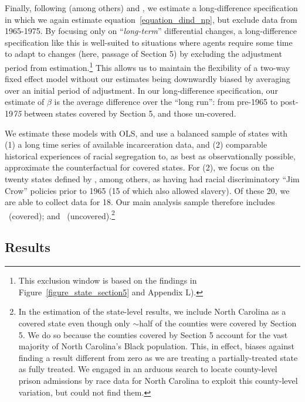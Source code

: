 \documentclass[12pt]{article}
\begin{document}
Finally, following (among others) \cite{Washington:2014tk} and \cite{Facchini:2020tb}, we estimate a long-difference specification in which we again estimate equation~\ref{equation_dind_np}, but exclude data from 1965-1975. By focusing only on ``\emph{long-term}'' differential changes, a long-difference specification like this is well-suited to situations where agents require some time to adapt to changes (here, passage of Section 5) by excluding the adjustment period from estimation.\footnote{This exclusion window is based on the findings in Figure~\ref{figure_state_section5} and Appendix L).} This allows us to maintain the flexibility of a two-way fixed effect model without our estimates being downwardly biased by averaging over an initial period of adjustment. In our long-difference specification, our estimate of $\beta$ is the average difference over the ``long run'': from pre-1965 to post-19\emph{75} between states covered by Section 5, and those un-covered.

We estimate these models with OLS, and use a balanced sample of states with (1) a long time series of available incarceration data, and (2) comparable historical experiences of racial segregation to, as best as observationally possible, approximate the counterfactual for covered states.  For (2), we focus on the twenty states defined by \cite{Katznelson:2012vu}, among others, as having had racial discriminatory ``Jim Crow'' policies prior to 1965 (15 of which also allowed slavery). Of these 20, we are able to collect data for 18.  Our main analysis sample therefore includes  \unskip~(covered); and \unskip~(uncovered).\footnote{In the estimation of the state-level results, we include North Carolina as a covered state even though only $\sim$\unskip half of the counties were covered by Section 5. We do so because the counties covered by Section 5 account for the vast majority of North Carolina's Black population. This, in effect, biases against finding a result different from zero as we are treating a partially-treated state as fully treated.  We engaged in an arduous search to locate county-level prison admissions by race data for North Carolina to exploit this county-level variation, but could not find them.}




\subsection*{Results}
\end{document}
